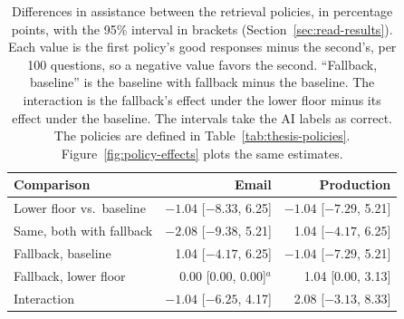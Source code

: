 \begin{table}[!htbp]
\centering\footnotesize
\setlength{\tabcolsep}{3pt}
\caption[Differences in assistance between the retrieval policies]{Differences in assistance between the retrieval policies, in percentage points, with the 95\% interval in brackets (Section~\ref{sec:read-results}). Each value is the first policy's good responses minus the second's, per 100 questions, so a negative value favors the second. ``Fallback, baseline'' is the baseline with fallback minus the baseline. The interaction is the fallback's effect under the lower floor minus its effect under the baseline. The intervals take the AI labels as correct. The policies are defined in Table~\ref{tab:thesis-policies}. Figure~\ref{fig:policy-effects} plots the same estimates.}
\label{tab:luna-effects}
\begin{tabular}{lrr}
\toprule
Comparison & Email & Production \\
\midrule
Lower floor vs.\ baseline & $-1.04$ [$-8.33$, 6.25] & $-1.04$ [$-7.29$, 5.21] \\
Same, both with fallback & $-2.08$ [$-9.38$, 5.21] & 1.04 [$-4.17$, 6.25] \\
Fallback, baseline & 1.04 [$-4.17$, 6.25] & $-1.04$ [$-7.29$, 5.21] \\
Fallback, lower floor & 0.00 [0.00, 0.00]$^{a}$ & 1.04 [0.00, 3.13] \\
Interaction & $-1.04$ [$-6.25$, 4.17] & 2.08 [$-3.13$, 8.33] \\
\bottomrule
\end{tabular}
\par{}
\end{table}
